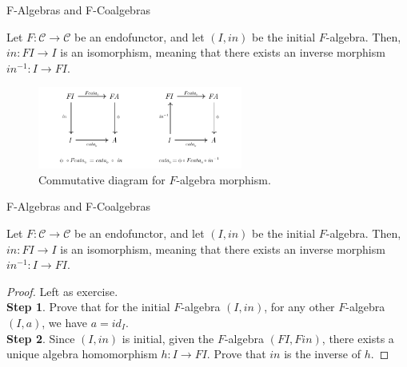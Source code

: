 \documentclass[aspectratio=169,xcolor=dvipsnames,10pt]{beamer}
\theoremstyle{definition}
\begin{document}
\begin{frame}[fragile]{F-Algebras and F-Coalgebras}
    \begin{theorem}
        Let $F:\mathcal C \to \mathcal C$ be an endofunctor, and let
        $(I,in)$ be the initial $F$-algebra. Then, $in:F I \to I$ is an isomorphism,
        meaning that there exists an inverse morphism $in^{-1}:I \to F I$.
    \end{theorem}
    \begin{figure}[H]
        \begin{center}
            \includegraphics[width=0.6\textwidth]{../notebooks/catamorphism.pdf}
        \end{center}
        \caption{Commutative diagram for $F$-algebra morphism.}
        \label{fig:falgebra}
    \end{figure}
\end{frame}

\begin{frame}[fragile]{F-Algebras and F-Coalgebras}
    \begin{theorem}
        Let $F:\mathcal C \to \mathcal C$ be an endofunctor, and let
        $(I,in)$ be the initial $F$-algebra. Then, $in:F I \to I$ is an isomorphism,
        meaning that there exists an inverse morphism $in^{-1}:I \to F I$.
    \end{theorem}
    \begin{proof}
        Left as exercise.
        \\
        \textbf{Step 1}. Prove that for the initial $F$-algebra $(I,in)$,
        for any other $F$-algebra $(I,a)$, we have $a = id_I$.
        \\
        \textbf{Step 2}. Since $(I,in)$ is initial, given the $F$-algebra
        $(FI,Fin)$, there exists a unique algebra homomorphism $h: I \to FI$.
        Prove that $in$ is the inverse of $h$.
    \end{proof}
\end{frame}
\end{document}
